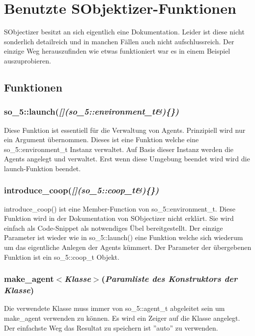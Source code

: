 \chapter{Benutzte SObjektizer-Funktionen}

\vspace{10mm}

SObjectizer besitzt an sich eigentlich eine Dokumentation. Leider ist diese
nicht sonderlich detailreich und in manchen Fällen auch nicht aufschlussreich.
Der einzige Weg herauszufinden wie etwas funktioniert war es in einem Beispiel auszuprobieren.

\section{Funktionen}

\subsection{so\_5::launch(\textit{[](so\_5::environment\_t\&)\{\})}}
Diese Funktion ist essentiell für die Verwaltung von Agents. Prinzipiell wird nur ein Argument übernommen.
Dieses ist eine Funktion welche eine so\_5::environment\_t Instanz verwaltet. Auf Basis dieser Instanz werden
die Agents angelegt und verwaltet. Erst wenn diese Umgebung beendet wird wird die launch-Funktion beendet.

\subsection{introduce\_coop(\textit{[](so\_5::coop\_t\&)\{\})}}
introduce\_coop() ist eine Member-Function von so\_5::environment\_t. Diese Funktion wird in der Dokumentation von
SObjectizer nicht erklärt. Sie wird einfach als Code-Snippet als notwendiges Übel bereitgestellt. Der einzige
Parameter ist wieder wie in so\_5::launch() eine Funktion welche sich wiederum um das eigentliche Anlegen der
Agents kümmert. Der Parameter der übergebenen Funktion ist ein so\_5::coop\_t Objekt.

\subsection{make\_agent$<$\textit{Klasse}$>$(\textit{Paramliste des Konstruktors der Klasse})}
Die verwendete Klasse muss immer von so\_5::agent\_t abgeleitet sein um make\_agent verwenden zu können.
Es wird ein Zeiger auf die Klasse angelegt. Der einfachste Weg das Resultat zu speichern ist ''auto'' zu
verwenden.

